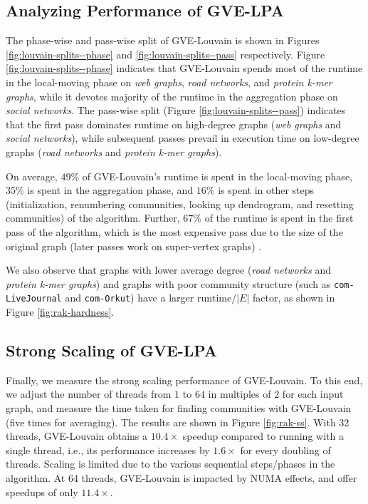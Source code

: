 





\subsection{Analyzing Performance of GVE-LPA}

The phase-wise and pass-wise split of GVE-Louvain is shown in Figures \ref{fig:louvain-splits--phase} and \ref{fig:louvain-splits--pass} respectively. Figure \ref{fig:louvain-splits--phase} indicates that GVE-Louvain spends most of the runtime in the local-moving phase on \textit{web graphs}, \textit{road networks}, and \textit{protein k-mer graphs}, while it devotes majority of the runtime in the aggregation phase on \textit{social networks}. The pass-wise split (Figure \ref{fig:louvain-splits--pass}) indicates that the first pass dominates runtime on high-degree graphs (\textit{web graphs} and \textit{social networks}), while subsequent passes prevail in execution time on low-degree graphs (\textit{road networks} and \textit{protein k-mer graphs}).

On average, $49\%$ of GVE-Louvain's runtime is spent in the local-moving phase, $35\%$ is spent in the aggregation phase, and $16\%$ is spent in other steps (initialization, renumbering communities, looking up dendrogram, and resetting communities) of the algorithm. Further, $67\%$ of the runtime is spent in the first pass of the algorithm, which is the most expensive pass due to the size of the original graph (later passes work on super-vertex graphs) \cite{com-wickramaarachchi14}.

We also observe that graphs with lower average degree (\textit{road networks} and \textit{protein k-mer graphs}) and graphs with poor community structure (such as \verb|com-LiveJournal| and \verb|com-Orkut|) have a larger $\text{runtime}/|E|$ factor, as shown in Figure \ref{fig:rak-hardness}.





\subsection{Strong Scaling of GVE-LPA}

Finally, we measure the strong scaling performance of GVE-Louvain. To this end, we adjust the number of threads from $1$ to $64$ in multiples of $2$ for each input graph, and measure the time taken for finding communities with GVE-Louvain (five times for averaging). The results are shown in Figure \ref{fig:rak-ss}. With 32 threads, GVE-Louvain obtains a $10.4\times$ speedup compared to running with a single thread, i.e., its performance increases by $1.6\times$ for every doubling of threads. Scaling is limited due to the various sequential steps/phases in the algorithm. At 64 threads, GVE-Louvain is impacted by NUMA effects, and offer speedups of only $11.4\times$.
